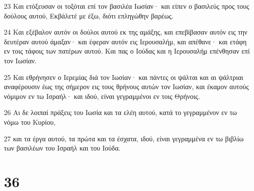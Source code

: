 \par 23 Και ετόξευσαν οι τοξόται επί τον βασιλέα Ιωσίαν· και είπεν ο βασιλεύς προς τους δούλους αυτού, Εκβάλετέ με έξω, διότι επληγώθην βαρέως.
\par 24 Και εξέβαλον αυτόν οι δούλοι αυτού εκ της αμάξης, και επεβίβασαν αυτόν εις την δευτέραν αυτού άμαξαν· και έφεραν αυτόν εις Ιερουσαλήμ, και απέθανε· και ετάφη εν τοις τάφοις των πατέρων αυτού. Και πας ο Ιούδας και η Ιερουσαλήμ επένθησαν επί τον Ιωσίαν.
\par 25 Και εθρήνησεν ο Ιερεμίας διά τον Ιωσίαν· και πάντες οι ψάλται και αι ψάλτριαι αναφέρουσιν έως της σήμερον εις τους θρήνους αυτών τον Ιωσίαν, και έκαμον αυτούς νόμιμον εν τω Ισραήλ· και ιδού, είναι γεγραμμένοι εν τοις Θρήνοις.
\par 26 Αι δε λοιπαί πράξεις του Ιωσία και τα ελέη αυτού, κατά το γεγραμμένον εν τω νόμω του Κυρίου,
\par 27 και τα έργα αυτού, τα πρώτα και τα έσχατα, ιδού, είναι γεγραμμένα εν τω βιβλίω των βασιλέων του Ισραήλ και του Ιούδα.

\chapter{36}

